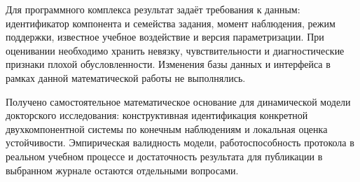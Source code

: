 \documentclass[11pt,a4paper]{article}
\begin{document}
Для программного комплекса результат задаёт требования к данным: идентификатор компонента и семейства задания, момент наблюдения, режим поддержки, известное учебное воздействие и версия параметризации. При оценивании необходимо хранить невязку, чувствительности и диагностические признаки плохой обусловленности. Изменения базы данных и интерфейса в рамках данной математической работы не выполнялись.\par

Получено самостоятельное математическое основание для динамической модели докторского исследования: конструктивная идентификация конкретной двухкомпонентной системы по конечным наблюдениям и локальная оценка устойчивости. Эмпирическая валидность модели, работоспособность протокола в реальном учебном процессе и достаточность результата для публикации в выбранном журнале остаются отдельными вопросами.\par
\end{document}
